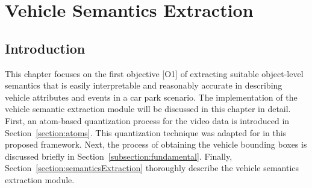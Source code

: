 \chapter{Vehicle Semantics Extraction}

\label{section:semanticsextraction}

\section{Introduction}

This chapter focuses on the first objective [O1] of extracting suitable object-level semantics that is easily interpretable and reasonably accurate in describing vehicle attributes and events in a car park scenario. 
The implementation of the vehicle semantic extraction module will be discussed in this chapter in detail.
First, an atom-based quantization process for the video data is introduced in Section~\ref{section:atoms}.
This quantization technique was adapted for in this proposed framework.
Next, the process of obtaining the vehicle bounding boxes is discussed briefly in Section~\ref{subsection:fundamental}. 
Finally, Section~\ref{section:semanticsExtraction} thoroughly describe the vehicle semantics extraction module.


